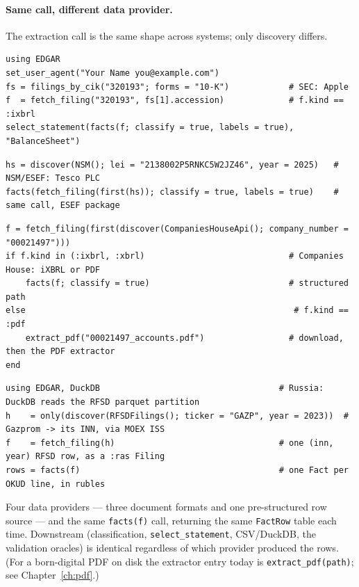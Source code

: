 \documentclass[11pt,a4paper]{report}
\begin{document}
\paragraph{Same call, different data provider.} The extraction call is the same shape across systems;
only discovery differs.

\begin{lstlisting}
using EDGAR
set_user_agent("Your Name you@example.com")
fs = filings_by_cik("320193"; forms = "10-K")            # SEC: Apple
f  = fetch_filing("320193", fs[1].accession)             # f.kind == :ixbrl
select_statement(facts(f; classify = true, labels = true), "BalanceSheet")
\end{lstlisting}

\begin{lstlisting}
hs = discover(NSM(); lei = "2138002P5RNKC5W2JZ46", year = 2025)   # NSM/ESEF: Tesco PLC
facts(fetch_filing(first(hs)); classify = true, labels = true)    # same call, ESEF package
\end{lstlisting}

\begin{lstlisting}
f = fetch_filing(first(discover(CompaniesHouseApi(); company_number = "00021497")))
if f.kind in (:ixbrl, :xbrl)                             # Companies House: iXBRL or PDF
    facts(f; classify = true)                            # structured path
else                                                      # f.kind == :pdf
    extract_pdf("00021497_accounts.pdf")                 # download, then the PDF extractor
end
\end{lstlisting}

\begin{lstlisting}
using EDGAR, DuckDB                                    # Russia: DuckDB reads the RFSD parquet partition
h    = only(discover(RFSDFilings(); ticker = "GAZP", year = 2023))  # Gazprom -> its INN, via MOEX ISS
f    = fetch_filing(h)                                 # one (inn, year) RFSD row, as a :ras Filing
rows = facts(f)                                        # one Fact per OKUD line, in rubles
\end{lstlisting}

\noindent Four data providers --- three document formats and one pre-structured row source --- and the
same \texttt{facts(f)} call, returning the same \texttt{FactRow} table each time. Downstream
(classification, \texttt{select\_statement}, CSV/DuckDB, the validation oracles) is identical regardless
of which provider produced the rows. (For a born-digital PDF on disk the extractor entry today is
\texttt{extract\_pdf(path)}; see Chapter~\ref{ch:pdf}.)
\end{document}
